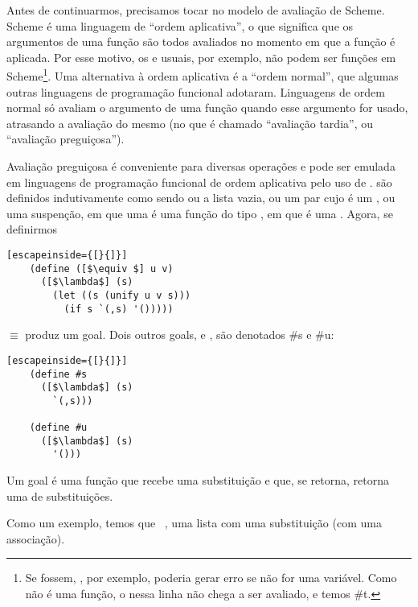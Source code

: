   Antes de continuarmos, precisamos tocar no modelo de avaliação de
  Scheme. Scheme é uma linguagem de ``ordem aplicativa'', o que
  significa que os argumentos de uma função são todos avaliados no
  momento em que a função é aplicada. Por esse motivo, os
   e  usuais, por exemplo, não podem ser
  funções em Scheme\footnote{Se fossem, , por
    exemplo, poderia gerar erro se  não for uma
    variável. Como  não é uma função, o 
    nessa linha não chega a ser avaliado, e temos 
    \seta \#t.}. Uma alternativa à ordem aplicativa é a ``ordem
  normal'', que algumas outras linguagens de programação funcional
  adotaram. Linguagens de ordem normal só avaliam o argumento de uma
  função quando esse argumento for usado, atrasando a avaliação do
  mesmo (no que é chamado ``avaliação tardia'', ou ``avaliação
  preguiçosa'').

  Avaliação preguiçosa é conveniente para diversas operações e pode
  ser emulada em linguagens de programação funcional de ordem
  aplicativa pelo uso de .  são
  definidos indutivamente como sendo ou a lista vazia, ou um par cujo
   é um , ou uma suspenção, em que
  uma  é uma função do tipo , em que  é uma
  . Agora, se definirmos

  \begin{lstlisting}[escapeinside={[}{]}]
    (define ([$\equiv $] u v)
      ([$\lambda$] (s)
        (let ((s (unify u v s)))
          (if s `(,s) '()))))
  \end{lstlisting}
        
  \noindent $\equiv $ produz um goal. Dois outros goals, 
  e , são denotados \#s e \#u:\\

  \begin{lstlisting}[escapeinside={[}{]}]
    (define #s
      ([$\lambda$] (s)
        `(,s)))

    (define #u
      ([$\lambda$] (s)
        '()))
  \end{lstlisting}

  Um goal é uma função que recebe uma substituição e que, se retorna,
  retorna uma  de substituições.

  Como um exemplo, temos que  \seta\
  , uma lista com uma substituição (com uma
  associação).

